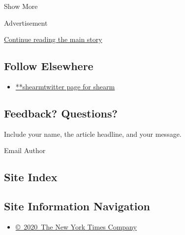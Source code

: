Show More

Advertisement

\protect\hyperlink{after-mid2}{Continue reading the main story}

\hypertarget{follow-elsewhere}{%
\subsection{Follow Elsewhere}\label{follow-elsewhere}}

\begin{itemize}
\tightlist
\item
  \href{https://twitter.com/shearm}{**shearmtwitter page for shearm}
\end{itemize}

\hypertarget{feedback-questions}{%
\subsection{Feedback? Questions?}\label{feedback-questions}}

Include your name, the article headline, and your message.

Email Author

\hypertarget{site-index}{%
\subsection{Site Index}\label{site-index}}

\hypertarget{site-information-navigation}{%
\subsection{Site Information
Navigation}\label{site-information-navigation}}

\begin{itemize}
\tightlist
\item
  \href{https://help.nytimes.com/hc/en-us/articles/115014792127-Copyright-notice}{©~2020~The
  New York Times Company}
\end{itemize}

